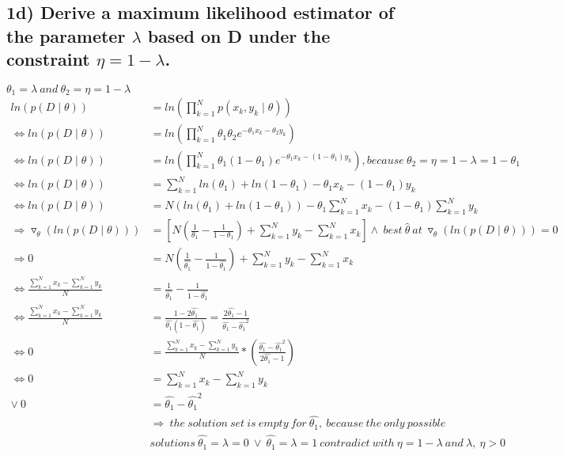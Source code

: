 \subsection*{1d) Derive a maximum likelihood estimator of the parameter $\lambda$ based on D under the constraint $\eta = 1-\lambda$.}
$\theta_1=\lambda\ and\ \theta_2=\eta=1-\lambda$
\begin{align*}
    ln(p(D\mid\theta))&=ln(\prod_{k=1}^N p(x_k, y_k\mid \theta))\\
    \Leftrightarrow ln(p(D\mid\theta))&=ln(\prod_{k=1}^N \theta_1\theta_2 e^{-\theta_1 x_k-\theta_2 y_k})\\
    \Leftrightarrow ln(p(D\mid\theta))&=ln(\prod_{k=1}^N \theta_1(1-\theta_1) e^{-\theta_1 x_k-(1-\theta_1) y_k}), because\  \theta_2=\eta=1-\lambda=1-\theta_1\\
    \Leftrightarrow ln(p(D\mid\theta))&=\sum_{k=1}^N ln(\theta_1)+ln(1-\theta_1)-\theta_1 x_k-(1-\theta_1) y_k\\
    \Leftrightarrow ln(p(D\mid\theta))&=N(ln(\theta_1)+ln(1-\theta_1))-\theta_1\sum_{k=1}^N x_k - (1-\theta_1)\sum_{k=1}^N y_k\\
    \Rightarrow \triangledown_\theta(ln(p(D\mid\theta)))&=\left[N(\frac{1}{\theta_1}-\frac{1}{1-\theta_1})+\sum_{k=1}^N y_k-\sum_{k=1}^N x_k\right] \land\ best\ \hat{\theta}\ at\  \triangledown_\theta(ln(p(D\mid\theta)))=0\\
    \Rightarrow 0&=N(\frac{1}{\hat{\theta_1}}-\frac{1}{1-\hat{\theta_1}})+\sum_{k=1}^N y_k-\sum_{k=1}^N x_k\\
    \Leftrightarrow\frac{\sum_{k=1}^N x_k-\sum_{k=1}^N y_k}{N}&=\frac{1}{\hat{\theta_1}}-\frac{1}{1-\hat{\theta_1}}\\
    \Leftrightarrow\frac{\sum_{k=1}^N x_k-\sum_{k=1}^N y_k}{N}&=\frac{1-2\hat{\theta_1}}{\hat{\theta_1}(1-\hat{\theta_1})}=\frac{2\hat{\theta_1}-1}{\hat{\theta_1}-\hat{\theta_1}^2}\\
    \Leftrightarrow 0&=\frac{\sum_{k=1}^N x_k-\sum_{k=1}^N y_k}{N}*\left(\frac{\hat{\theta_1}-\hat{\theta_1}^2}{2\hat{\theta_1}-1}\right)\\
    \Leftrightarrow 0&=\sum_{k=1}^N x_k-\sum_{k=1}^N y_k \\
    \vee\ 0&=\hat{\theta_1}-\hat{\theta_1}^2 \\
    &\Rightarrow\ the\ solution\ set\ is\ empty\ for\ \hat{\theta_1},\ because\ the\ only\ possible\ \\& solutions\ \hat{\theta_1}=\lambda=0\ \vee\  \hat{\theta_1}=\lambda=1\ contradict\ with\ \eta = 1-\lambda\ and\ \lambda,\ \eta>0\\
\end{align*}
